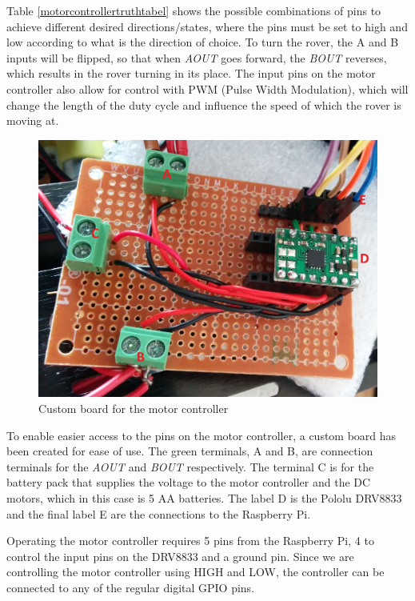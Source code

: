 Table \ref{motorcontrollertruthtabel} shows the possible combinations of pins to achieve different desired directions/states, where the pins must be set to high and low according to what is the direction of choice. To turn the rover, the A and B inputs will be flipped, so that when \textit{AOUT} goes forward, the \textit{BOUT} reverses, which results in the rover turning in its place.
The input pins on the motor controller also allow for control with PWM (Pulse Width Modulation), which will change the length of the duty cycle and influence the speed of which the rover is moving at\cite{DRV8833}.

\begin{figure}[H]
	\centering
	\includegraphics[width=.5\linewidth]{images/labelled.jpg}
	\caption{Custom board for the motor controller}
	\label{fig:customboardmc}	
\end{figure}

To enable easier access to the pins on the motor controller, a custom board has been created for ease of use. The green terminals, A and B, are connection terminals for the \textit{AOUT} and \textit{BOUT} respectively. The terminal C is for the battery pack that supplies the voltage to the motor controller and the DC motors, which in this case is 5 AA batteries. The label D is the Pololu DRV8833 and the final label E are the connections to the Raspberry Pi. 

Operating the motor controller requires 5 pins from the Raspberry Pi, 4 to control the input pins on the DRV8833 and a ground pin. Since we are controlling the motor controller using HIGH and LOW, the controller can be connected to any of the regular digital GPIO pins.